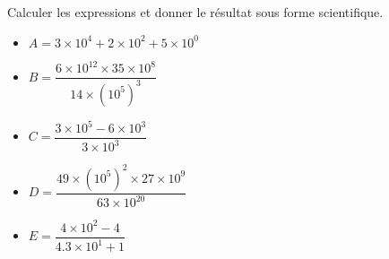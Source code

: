\begin{exercice*}
    Calculer les expressions et donner le résultat sous forme scientifique.
    \begin{spacing}{2}
        \begin{itemize}
            \item[] $A = 3\times 10^4 + 2\times 10^2 + 5\times 10^0$
            \item[] $B=\dfrac{6\times 10^{12}\times 35 \times 10^8}{14\times \left(10^5\right)^3}$
            \columnbreak
            \item[] $C=\dfrac{3\times 10^{5} - 6 \times 10^3}{3\times 10^3}$
            \item[] $D=\dfrac{49\times (10^{5})^2\times 27 \times 10^9}{63\times 10^{20}}$
            \item[] $E=\dfrac{4\times 10^{2} -4}{\num{4.3}\times 10^1 + 1}$
        \end{itemize}
    \end{spacing}
\end{exercice*}
